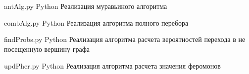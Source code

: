 \begin{appendices}
	\chapter{}
	
	{antAlg.py} %
	{Python} %
	{Реализация муравьиного алгоритма} %
	
	{combAlg.py} %
	{Python} %
	{Реализация алгоритма полного перебора} %
	
	
	{findProbs.py} %
	{Python} %
	{Реализация алгоритма расчета вероятностей перехода в не посещенную вершину графа} %
	
	{updPher.py} %
	{Python} %
	{Реализация алгоритма расчета значения феромонов} %
	\chapter{}
	

\end{appendices}

